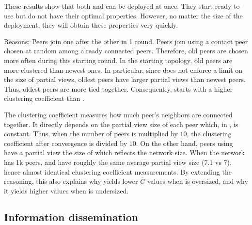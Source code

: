 \begin{asparadesc}
  These results show that both \SPRAY and \CYCLON can be deployed at once. They
  start ready-to-use but do not have their optimal properties. However, no
  matter the size of the deployment, they will obtain these properties very
  quickly.

\item[Reasons:] Peers join one after the other in 1 round. Peers join using a
  contact peer chosen at random among already connected peers. Therefore, old
  peers are chosen more often during this starting round. In the starting
  topology, old peers are more clustered than newest ones. In particular, since
  \SPRAY does not enforce a limit on the size of partial views, oldest peers
  have larger partial views than newest peers. Thus, oldest peers are more tied
  together. Consequently, \SPRAY starts with a higher clustering coefficient
  than \CYCLON. 

  The clustering coefficient measures how much peer's neighbors are connected
  together. It directly depends on the partial view size of each peer which, in
  \CYCLON, is constant. Thus, when the number of peers is multiplied by $10$,
  the clustering coefficient after convergence is divided by $10$. On the other
  hand, peers using \SPRAY have a partial view the size of which reflects the
  network size. When the network has 1k peers, \SPRAY and \CYCLON have roughly
  the same average partial view size (\SPRAY $7.1$ vs \CYCLON $7$), hence almost
  identical clustering coefficient measurements. By extending the reasoning,
  this also explains why \SPRAY yields lower $\overline{C}$ values when \CYCLON
  is oversized, and why it yields higher values when \CYCLON is undersized.
\end{asparadesc}


\subsection{Information dissemination}

